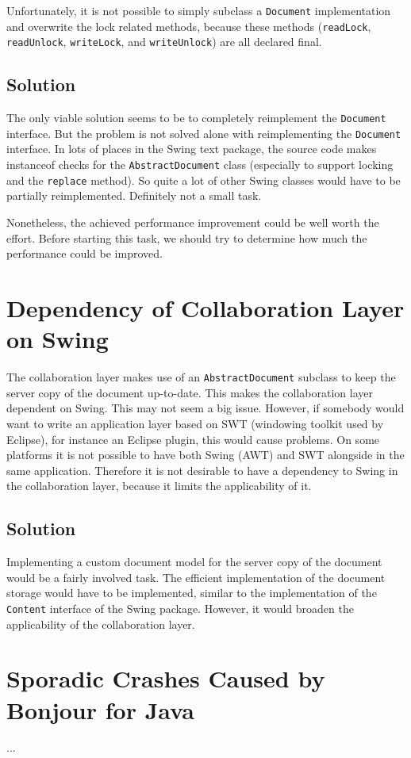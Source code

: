 Unfortunately, it is not possible to simply subclass a \texttt{Document}
implementation and overwrite the lock related methods, because these
methods (\texttt{read\-Lock}, \texttt{read\-Unlock}, \texttt{write\-Lock},
and \texttt{write\-Unlock}) are all declared final.


\subsection{Solution}
The only viable solution seems to be to completely reimplement the 
\texttt{Document} interface. But the problem is not solved alone with
reimplementing the \texttt{Document} interface. In lots of places in
the Swing text package, the source code makes instanceof checks for the
\texttt{Abstract\-Document} class (especially to support locking and
the \texttt{replace} method). So quite a lot of other Swing classes would
have to be partially reimplemented. Definitely not a small task.

Nonetheless, the achieved performance improvement could be well worth the 
effort. Before starting this task, we should try to determine how much
the performance could be improved.



\section{Dependency of Collaboration Layer on Swing}
The collaboration layer makes use of an \texttt{AbstractDocument} subclass to
keep the server copy of the document up-to-date. This makes the collaboration
layer dependent on Swing. This may not seem a big issue. However, if 
somebody would want to write an application layer based on SWT (windowing
toolkit used by Eclipse), for instance an Eclipse plugin, this would
cause problems. On some platforms it is not possible to have both Swing (AWT)
and SWT alongside in the same application. Therefore it is not desirable
to have a dependency to Swing in the collaboration layer, because it limits
the applicability of it.


\subsection{Solution}
Implementing a custom document model for the server copy of the document
would be a fairly involved task. The efficient implementation of the
document storage would have to be implemented, similar to the implementation
of the \texttt{Content} interface of the Swing package. However, it would
broaden the applicability of the collaboration layer.



\section{Sporadic Crashes Caused by Bonjour for Java}
...
